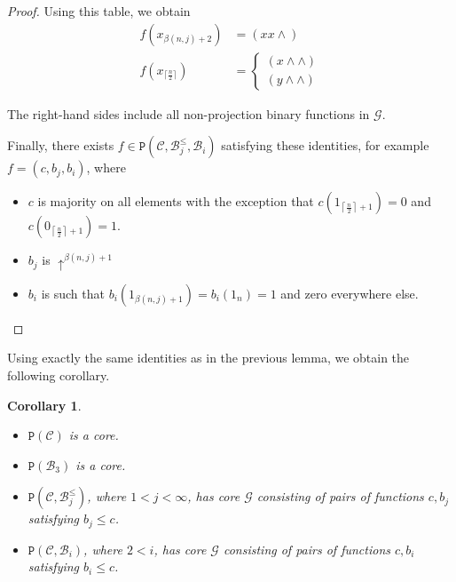 \documentclass{amsart}
\numberwithin{equation}{section}
\theoremstyle{plain}
\newtheorem{corollary}[theorem]{Corollary}
\theoremstyle{definition}
\def\clone#1{\mathcal{#1}}
\def\minion#1{\mathcal{#1}}
\def\Bc{\clone{B}}
\def\Cc{\clone{C}}
\def\atleast#1{\uparrow^{#1}}
\def\C#1{{\mathtt{P}}(#1)}
\begin{document}
\begin{proof}
Using this table, we obtain  
\begin{align*}
f(x_{\beta(n,j)+2}) &= (xx{\wedge}) \\
f(x_{\lceil\frac{n}{2}\rceil}) &= \left\{\begin{matrix}(x{\wedge}{\wedge}) \\ (y{\wedge}{\wedge})\end{matrix}\right.
\end{align*}

The right-hand sides include all non-projection binary functions in $\minion{G}$. 

Finally, there exists $f\in\C{\Cc,\Bc_j^\leq, \Bc_i}$ satisfying these identities, for example $f=(c,b_j,b_i)$, where
\begin{itemize}
\item $c$ is majority on all elements with the exception that $c(1_{\left\lceil\frac{n}{2}\right\rceil +1}) = 0$ and $c(0_{\left\lceil\frac{n}{2}\right\rceil +1}) = 1$.
\item $b_j$ is $\atleast{\beta(n,j)+1}$
\item $b_i$ is such that $b_i({1_{\beta(n,j)+1}})=b_i(1_n)=1$ and zero everywhere else.
\end{itemize}
\end{proof}

Using exactly the same identities as in the previous lemma, we obtain
the following corollary.

\begin{corollary}\label{cbjbicor}
  \hfill
    \begin{itemize}
        \item $\C{\Cc}$ is a core.
        \item $\C{\Bc_3}$ is a core.
        \item $\C{\Cc, \Bc_j^\leq}$, where $1<j<\infty$, has core $\minion{G}$ consisting of pairs of functions $c, b_j$ satisfying $b_j\leq c$.
        \item $\C{\Cc, \Bc_i}$, where $2<i$, has core $\minion{G}$ consisting of pairs of functions $c, b_i$ satisfying $b_i\leq c$.
    \end{itemize}
\end{corollary}
\end{document}
